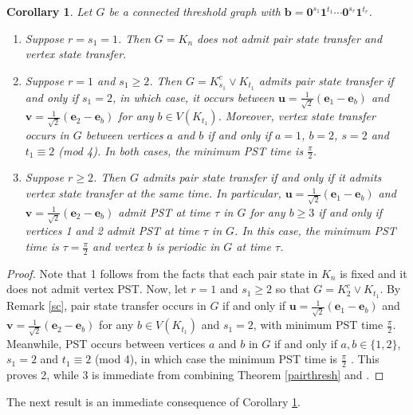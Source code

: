 \documentclass[preprint]{elsarticle}
\newtheorem{corollary}[theorem]{Corollary}
\begin{document}
\begin{corollary}
\label{corlast}
Let $G$ be a connected threshold graph with  $\mathbf{b}=\mathbf{0}^{s_1}\mathbf{1}^{t_1}\cdots \mathbf{0}^{s_r}\mathbf{1}^{t_r}$. 
\begin{enumerate}
\item Suppose $r=s_1=1$. Then $G=K_n$ does not admit pair state transfer and vertex state transfer.
\item Suppose $r=1$ and $s_1\geq 2$. Then $G=K^c_{s_1}\vee K_{t_1}$ admits pair state transfer if and only if $s_1=2$, in which case, it occurs between $\mathbf{u}=\frac{1}{\sqrt2}(\mathbf{e}_1-\mathbf{e}_b)$ and $\mathbf{v}=\frac{1}{\sqrt2}(\mathbf{e}_2-\mathbf{e}_b)$ for any $b\in V(K_{t_1})$. Moreover, vertex state transfer occurs in $G$ between vertices $a$ and $b$ if and only if $a=1$, $b=2$, $s=2$ and $t_1\equiv 2$ (mod 4). In both cases, the minimum PST time is $\frac{\pi}{2}$.
\item Suppose $r\geq 2$. Then $G$ admits pair state transfer if and only if it admits vertex state transfer at the same time. In particular, $\mathbf{u}=\frac{1}{\sqrt2}(\mathbf{e}_1-\mathbf{e}_b)$ and $\mathbf{v}=\frac{1}{\sqrt2}(\mathbf{e}_2-\mathbf{e}_b)$ admit PST at time $\tau$ in $G$ for any $b\geq 3$ if and only if vertices 1 and 2 admit PST at time $\tau$ in $G$. In this case, the minimum PST time is $\tau=\frac{\pi}{2}$ and vertex $b$ is periodic in $G$ at time $\tau$.
\end{enumerate}
\end{corollary}

\begin{proof}
Note that 1 follows from the facts that each pair state in $K_n$ is fixed and it does not admit vertex PST.
Now, let $r=1$ and $s_1\geq 2$ so that $G=K^c_2\vee K_{t_1}$. By Remark \ref{sc}, pair state transfer occurs in $G$ if and only if $\mathbf{u}=\frac{1}{\sqrt2}(\mathbf{e}_1-\mathbf{e}_b)$ and $\mathbf{v}=\frac{1}{\sqrt2}(\mathbf{e}_2-\mathbf{e}_b)$ for any $b\in V(K_{t_1})$ and $s_1=2$, with minimum PST time $\frac{\pi}{2}$. Meanwhile, PST occurs between vertices $a$ and $b$ in $G$ if and only if $a,b\in\{1,2\}$, $s_1=2$ and $t_1\equiv 2$ (mod 4), in which case the minimum PST time is $\frac{\pi}{2}$ \cite[Corollary 4]{alvir2016perfect}. This proves 2, while 3 is immediate from combining Theorem \ref{pairthresh} and  \cite[Theorem 2]{kirkland2011spin}.
\end{proof}

The next result is an immediate consequence of Corollary \ref{corlast}.
\end{document}
